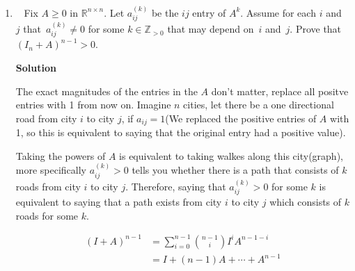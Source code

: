 \documentclass[11pt]{article}
\newcommand\score[1]{\marginpar{\vspace{-2ex}\color{blue}{#1/14}}\hspace{-1ex}}
\newcommand\0{\mathbf{0}}
\newcommand\CC{\mathbb{C}}
\newcommand\RR{\mathbb{R}}
\newcommand\ZZ{\mathbb{Z}}
\newcommand\GL{\mathit{GL}}
\newcommand\<{\langle}
\renewcommand\>{\rangle}
\begin{document}
\begin{enumerate}
Let's take a concrete example, say $a=1$ and $b=\sqrt{2}$. Assume you made some open subset in $\GL_2(\CC)$, such the 
intersection of this subspace with the image corresponded to the interval (-1,1). Obviously, $\GL_2(\CC)$ has a norm, you can 
view it as a space that is isomorphic to $\RR^{8}$ and do the normal euclidean norm. I argue I can find a matrix in the image, that is 
arbitrarily close to $I$ in euclidean distance terms, but not in the interval because I can find some arbitrarily large value of $x$
such that $|I-exp_{iA}(x)|<\epsilon$, for any $\epsilon>0$. Why? assume I fix $\epsilon$, then I keep increasing $x$, the values of $e^{ita}$ and $e^{itb}$ keep looping, but they are never in sync,
everytime there is some grap between their positions, this gap never goes to zero, but it doesn't diverge either, it keeps oscillating, and at some point with 
probabilty $1^{*}$, it gets close enough to 0, arbitrarily closely(therefore arbitrarily close to $I$).

The basic idea of my proof is that, the image is too dense, any level of precision is insuffient since there are
infinitely many ranges in a nonzero amount of volume(you have fit the whole number line in the small hypercube).

\item\ \score{}%
Fix $A \geq 0$ in $\RR^{n \times n}$.  Let $a^{(k)}_{ij}$ be the $ij$
entry of $A^k$.  Assume for each $i$ and~$j$ that~$a^{(k)}_{ij} \neq
0$ for some $k \in \ZZ_{> 0}$ that may depend on~$i$ and~$j$.  Prove
that $(I_n + A)^{n-1} > 0$.

\textbf{Solution}

The exact magnitudes of the entries in the $A$ don't matter, replace all positve entries with 1 from now on.
Imagine $n$ cities, let there be a one directional road from city $i$ to city $j$, if $a_{ij}=1$(We replaced the positive entries
of $A$ with 1, so this is equivalent to saying that the original entry had a positive value).

Taking the powers of $A$ is equivalent to taking walkes along this city(graph), more specifically
$a_{ij}^{(k)}>0$ tells you whether there is a path that consists of $k$ roads from city $i$ to city $j$. 
Therefore, saying that $a_{ij}^{(k)}>0$ for some $k$ is equivalent to saying that a path exists from city $i$ to city
$j$ which consists of $k$ roads for some $k$.

\begin{align*}
	(I+A)^{n-1}&=\sum_{i=0}^{n-1}\binom{n-1}{i} I^{i}A^{n-1-i}\\
	&= I + (n-1)A + \cdots + A^{n-1}
\end{align*}


\end{enumerate}
\end{document}
